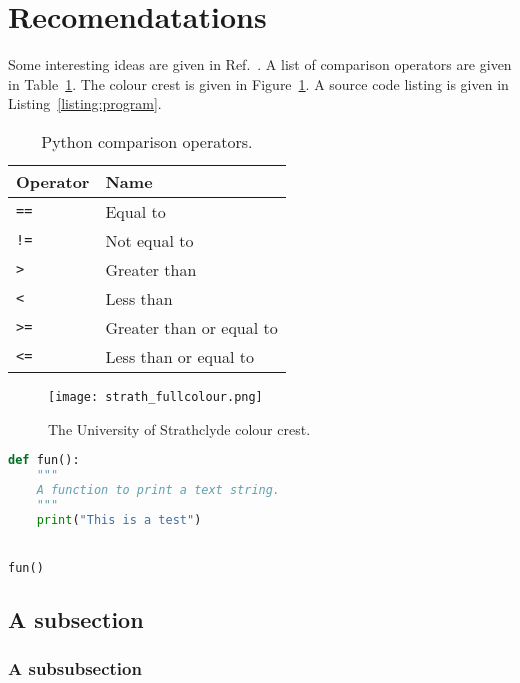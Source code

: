 \section{Recomendatations}
Some interesting ideas are given in Ref.~\cite{turing1950computing}.  A list of comparison operators are given in Table~\ref{table:comparison-operators}.  The colour crest is given in Figure~\ref{figure:colour-crest}.  A source code listing is given in Listing~\ref{listing:program}.

\begin{table}[h!!]
  \begin{center}
    \caption{Python comparison operators.}
    \label{table:comparison-operators}
    \begin{tabular}{l|l} \hline
      \textbf{Operator} & \textbf{Name}\\
      \hline
      \texttt{==} & Equal to\\
      \texttt{!=} & Not equal to\\
      \texttt{>} & Greater than\\
      \texttt{<} & Less than\\
      \texttt{>=} & Greater than or equal to\\
      \texttt{<=} & Less than or equal to\\ \hline
    \end{tabular}
  \end{center}
\end{table}

\begin{figure}[h!!]
  \begin{center}
    \texttt{[image: strath\_fullcolour.png]}
    \caption{The University of Strathclyde colour crest.}
    \label{figure:colour-crest}
  \end{center}
\end{figure}

\begin{singlespacing}
\begin{lstlisting}[language=python,caption={Demonstrating source code listing.},label=listing:program]
def fun():
    """
    A function to print a text string.
    """
    print("This is a test")


fun()
\end{lstlisting}
\end{singlespacing}

\lipsum[1-2]
\subsection{A subsection}
\lipsum[1-2]
\subsubsection{A subsubsection}
\lipsum[1-2]